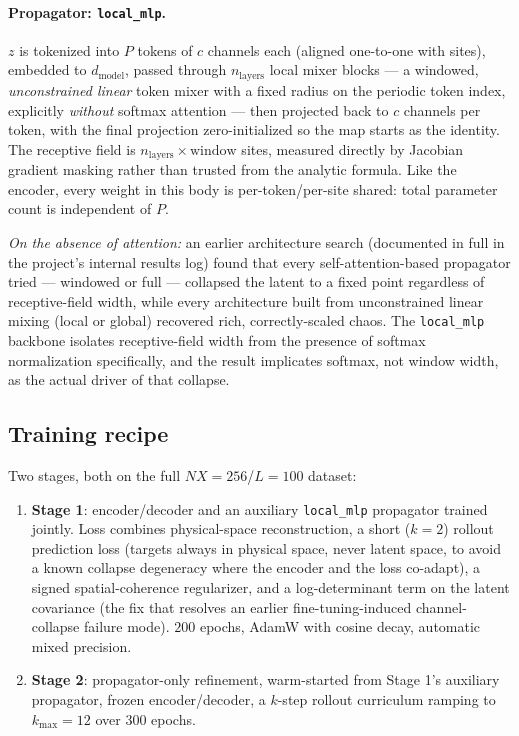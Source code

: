 \documentclass[11pt]{article}
\begin{document}
\paragraph{Propagator: \texttt{local\_mlp}.} $z$ is tokenized into $P$
tokens of $c$ channels each (aligned one-to-one with sites), embedded to
$d_{\mathrm{model}}$, passed through $n_{\mathrm{layers}}$ local mixer
blocks --- a windowed, \emph{unconstrained linear} token mixer with a
fixed radius on the periodic token index, explicitly \emph{without}
softmax attention --- then projected back to $c$ channels per token,
with the final projection zero-initialized so the map starts as the
identity. The receptive field is $n_{\mathrm{layers}} \times
\mathrm{window}$ sites, measured directly by Jacobian gradient masking
rather than trusted from the analytic formula. Like the encoder, every
weight in this body is per-token/per-site shared: total parameter count
is independent of $P$.

\emph{On the absence of attention:} an earlier architecture search
(documented in full in the project's internal results log) found that
every self-attention-based propagator tried --- windowed or full ---
collapsed the latent to a fixed point regardless of receptive-field
width, while every architecture built from unconstrained linear mixing
(local or global) recovered rich, correctly-scaled chaos. The
\texttt{local\_mlp} backbone isolates receptive-field width from the
presence of softmax normalization specifically, and the result
implicates softmax, not window width, as the actual driver of that
collapse.

\subsection{Training recipe}

Two stages, both on the full $NX=256$/$L=100$ dataset:

\begin{enumerate}[nosep]
\item \textbf{Stage 1}: encoder/decoder and an auxiliary
  \texttt{local\_mlp} propagator trained jointly. Loss combines
  physical-space reconstruction, a short ($k{=}2$) rollout prediction
  loss (targets always in physical space, never latent space, to avoid
  a known collapse degeneracy where the encoder and the loss co-adapt),
  a signed spatial-coherence regularizer, and a log-determinant term on
  the latent covariance (the fix that resolves an earlier
  fine-tuning-induced channel-collapse failure mode). $200$ epochs,
  AdamW with cosine decay, automatic mixed precision.
\item \textbf{Stage 2}: propagator-only refinement, warm-started from
  Stage 1's auxiliary propagator, frozen encoder/decoder, a $k$-step
  rollout curriculum ramping to $k_{\max}=12$ over $300$ epochs.
\end{enumerate}
\end{document}
